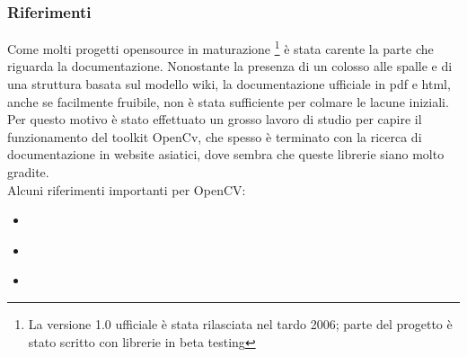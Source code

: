 



\subsubsection{Riferimenti}

Come molti progetti opensource in maturazione \footnote{La versione 1.0 ufficiale è stata rilasciata nel tardo 2006; parte del progetto è stato scritto con librerie in beta testing} è stata carente la parte che riguarda la documentazione. Nonostante la presenza di un colosso alle spalle e di una struttura basata sul modello wiki, la documentazione ufficiale in pdf e html, anche se facilmente fruibile, non è stata sufficiente per colmare le lacune iniziali. Per questo motivo è stato effettuato un grosso lavoro di studio per capire il funzionamento del toolkit OpenCv, che spesso è terminato con la ricerca di documentazione in website asiatici, dove sembra che queste librerie siano molto gradite.\\
Alcuni riferimenti importanti per OpenCV:
\begin{itemize}
 \item {} \cite{opencv}
\item {} \cite{opencvwiki}
\item {} \cite{opencvgroups}
\end{itemize}


